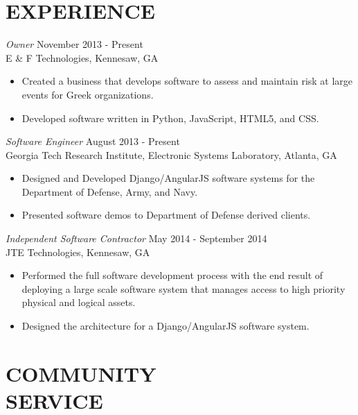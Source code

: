 \documentclass[margin, 10pt]{res} %
\begin{document}
\begin{resume}

\section{EXPERIENCE}

{\sl Owner} \hfill November 2013 - Present \\
E \& F Technologies, Kennesaw, GA
\begin{itemize}
\item Created a business that develops software to assess and maintain risk at large events for Greek organizations.
\item Developed software written in Python, JavaScript, HTML5, and CSS.
\end{itemize}

{\sl Software Engineer} \hfill August 2013 - Present \\
Georgia Tech Research Institute, Electronic Systems Laboratory, Atlanta, GA
\begin{itemize} \itemsep -2pt %
\item Designed and Developed Django/AngularJS software systems for the Department of Defense, Army, and Navy.
\item Presented software demos to Department of Defense derived clients.
\end{itemize}

{\sl Independent Software Contractor} \hfill May 2014 - September 2014\\
JTE Technologies, Kennesaw, GA
\begin{itemize}
\item Performed the full software development process with the end result of deploying a large scale software system that manages access to high priority physical and logical assets.
\item Designed the architecture for a Django/AngularJS software system.
\end{itemize}



\section{COMMUNITY \\ SERVICE}


\end{resume}
\end{document}
